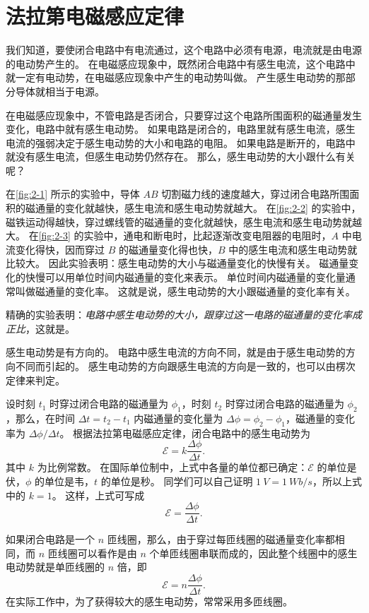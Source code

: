 \section{法拉第电磁感应定律}
我们知道，要使闭合电路中有电流通过，这个电路中必须有电源，电流就是由电源的电动势产生的。
在电磁感应现象中，既然闭合电路中有感生电流，这个电路中就一定有电动势，在电磁感应现象中产生的电动势叫做。
产生感生电动势的那部分导体就相当于电源。

在电磁感应现象中，不管电路是否闭合，只要穿过这个电路所围面积的磁通量发生变化，电路中就有感生电动势。
如果电路是闭合的，电路里就有感生电流，感生电流的强弱决定于感生电动势的大小和电路的电阻。
如果电路是断开的，电路中就没有感生电流，但感生电动势仍然存在。
那么，感生电动势的大小跟什么有关呢？

在\cref{fig:2-1} 所示的实验中，导体 $AB$ 切割磁力线的速度越大，穿过闭合电路所围面积的磁通量的变化就越快，感生电流和感生电动势就越大。
在\cref{fig:2-2} 的实验中，磁铁运动得越快，穿过螺线管的磁通量的变化就越快，感生电流和感生电动势就越大。
在\cref{fig:2-3} 的实验中，通电和断电时，比起逐渐改变电阻器的电阻时，$A$ 中电流变化得快，因而穿过 $B$ 的磁通量变化得也快，$B$ 中的感生电流和感生电动势就比较大。
因此实验表明：感生电动势的大小与磁通量变化的快慢有关。
磁通量变化的快慢可以用单位时间内磁通量的变化来表示。
单位时间内磁通量的变化量通常叫做磁通量的变化率。
这就是说，感生电动势的大小跟磁通量的变化率有关。

精确的实验表明：\emph{电路中感生电动势的大小，跟穿过这一电路的磁通量的变化率成正比}，这就是。

感生电动势是有方向的。
电路中感生电流的方向不同，就是由于感生电动势的方向不同而引起的。
感生电动势的方向跟感生电流的方向是一致的，也可以由楞次定律来判定。

设时刻 $t_1$ 时穿过闭合电路的磁通量为 $\phi_1$，时刻 $t_2$ 时穿过闭合电路的磁通量为 $\phi_2$，那么，在时间 $\Delta t=t_2-t_1$ 内磁通量的变化量为 $\Delta \phi=\phi_2-\phi_1$，磁通量的变化率为 $\Delta \phi/\Delta t$。
根据法拉第电磁感应定律，闭合电路中的感生电动势为
\[\mathcal{E}=k\frac{\Delta \phi}{\Delta t}.\]
其中 $k$ 为比例常数。
在国际单位制中，上式中各量的单位都已确定：$\mathcal{E}$ 的单位是伏，$\phi$ 的单位是韦，$t$ 的单位是秒。
同学们可以自己证明 $\qty{1}{V}=\qty{1}{Wb/s}$，所以上式中的 $k=1$。
这样，上式可写成
\begin{equation}
  \mathcal{E}=\frac{\Delta \phi}{\Delta t}.
\end{equation}

如果闭合电路是一个 $n$ 匝线圈，那么，由于穿过每匝线圈的磁通量变化率都相同，而 $n$ 匝线圈可以看作是由 $n$ 个单匝线圈串联而成的，因此整个线圈中的感生电动势就是单匝线圈的 $n$ 倍，即
\begin{equation}
  \mathcal{E}=n\frac{\Delta \phi}{\Delta t}.
\end{equation}
在实际工作中，为了获得较大的感生电动势，常常采用多匝线圈。

